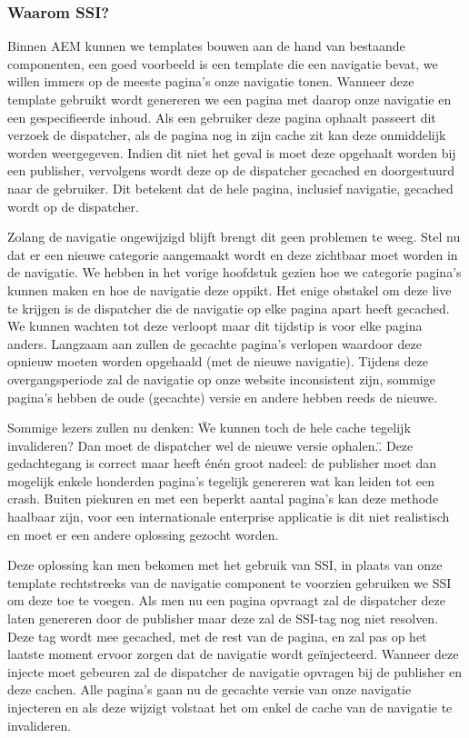 \documentclass{article}
\begin{document}
	\subsubsection{Waarom SSI?}
    Binnen AEM kunnen we templates bouwen aan de hand van bestaande componenten, een goed voorbeeld is een template die een navigatie bevat, we willen immers op de meeste pagina's onze navigatie tonen. Wanneer deze template gebruikt wordt genereren we een pagina met daarop onze navigatie en een gespecifieerde inhoud. Als een gebruiker deze pagina ophaalt passeert dit verzoek de dispatcher, als de pagina nog in zijn cache zit kan deze onmiddelijk worden weergegeven. Indien dit niet het geval is moet deze opgehaalt worden bij een publisher, vervolgens wordt deze op de dispatcher gecached en doorgestuurd naar de gebruiker. Dit betekent dat de hele pagina, inclusief navigatie, gecached wordt op de dispatcher. 
    \par
    Zolang de navigatie ongewijzigd blijft brengt dit geen problemen te weeg. Stel nu dat er een nieuwe categorie aangemaakt wordt en deze zichtbaar moet worden in de navigatie. We hebben in het vorige hoofdstuk gezien hoe we categorie pagina's kunnen maken en hoe de navigatie deze oppikt. Het enige obstakel om deze live te krijgen is de dispatcher die de navigatie op elke pagina apart heeft gecached. We kunnen wachten tot deze verloopt maar dit tijdstip is voor elke pagina anders. Langzaam aan zullen de gecachte pagina's verlopen waardoor deze opnieuw moeten worden opgehaald (met de nieuwe navigatie). Tijdens deze overgangsperiode zal de navigatie op onze website inconsistent zijn, sommige pagina's hebben de oude (gecachte) versie en andere hebben reeds de nieuwe.
    \par
    Sommige lezers zullen nu denken: \"We kunnen toch de hele cache tegelijk invalideren? Dan moet de dispatcher wel de nieuwe versie ophalen.\". Deze gedachtegang is correct maar heeft \'en\'en groot nadeel: de publisher moet dan mogelijk enkele honderden pagina's tegelijk genereren wat kan leiden tot een crash. Buiten piekuren en met een beperkt aantal pagina's kan deze methode haalbaar zijn, voor een internationale enterprise applicatie is dit niet realistisch en moet er een andere oplossing gezocht worden.
    \par
    Deze oplossing kan men bekomen met het gebruik van SSI, in plaats van onze template rechtstreeks van de navigatie component te voorzien gebruiken we SSI om deze toe te voegen. Als men nu een pagina opvraagt zal de dispatcher deze laten genereren door de publisher maar deze zal de SSI-tag nog niet resolven. Deze tag wordt mee gecached, met de rest van de pagina, en zal pas op het laatste moment ervoor zorgen dat de navigatie wordt ge\"injecteerd. Wanneer deze injecte moet gebeuren zal de dispatcher de navigatie opvragen bij de publisher en deze cachen. Alle pagina's gaan nu de gecachte versie van onze navigatie injecteren en als deze wijzigt volstaat het om enkel de cache van de navigatie te invalideren.
\end{document}
